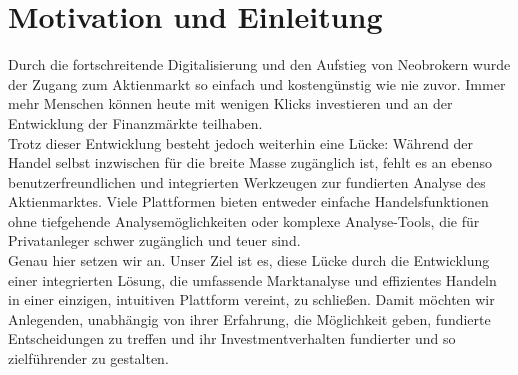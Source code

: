 \documentclass{article}
\begin{document}
\section{Motivation und Einleitung}
\begin{center} 
Durch die fortschreitende Digitalisierung und den Aufstieg von Neobrokern wurde der Zugang zum Aktienmarkt so einfach und kostengünstig wie nie zuvor. Immer mehr Menschen können heute mit wenigen Klicks investieren und an der Entwicklung der Finanzmärkte teilhaben.
\\
Trotz dieser Entwicklung besteht jedoch weiterhin eine Lücke: Während der Handel selbst inzwischen für die breite Masse zugänglich ist, fehlt es an ebenso benutzerfreundlichen und integrierten Werkzeugen zur fundierten Analyse des Aktienmarktes. Viele Plattformen bieten entweder einfache Handelsfunktionen ohne tiefgehende Analysemöglichkeiten oder komplexe Analyse-Tools, die für Privatanleger schwer zugänglich und teuer sind.
\\
Genau hier setzen wir an. Unser Ziel ist es, diese Lücke durch die Entwicklung einer integrierten Lösung, die umfassende Marktanalyse und effizientes Handeln in einer einzigen, intuitiven Plattform vereint, zu schließen. Damit möchten wir Anlegenden, unabhängig von ihrer Erfahrung, die Möglichkeit geben, fundierte Entscheidungen zu treffen und ihr Investmentverhalten fundierter und so zielführender zu gestalten.
\end{center}
\end{document}
